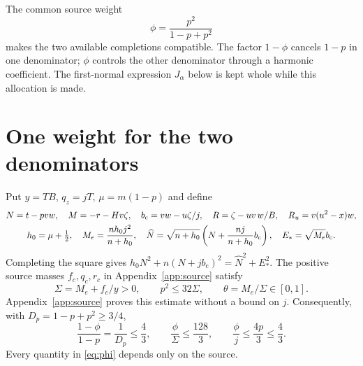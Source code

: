 \documentclass[10pt]{article}
\newcommand{\half}{\tfrac12}
\newcommand{\bc}{b_{\mathrm c}}
\begin{document}
The common source weight
\[
 \phi=\frac{p^2}{1-p+p^2}
\]
makes the two available completions compatible. The factor $1-\phi$ cancels
$1-p$ in one denominator; $\phi$ controls the other denominator through a
harmonic coefficient. The first-normal expression $J_\alpha$ below is kept
whole while this allocation is made.

\section{One weight for the two denominators}
Put $y=TB$, $q_z=jT$, $\mu=m(1-p)$ and define
\begin{gather}
 N=t-pvw,\quad M=-r-Hv\zeta,\quad
 \bc=vw-u\zeta/j,\quad R=\zeta-uv\,w/B,\quad R_u=v(u^2-x)w,\notag\\
 h_0=\mu+\half,\quad
 M_e=\frac{nh_0j^2}{n+h_0},\quad
 \widehat N=\sqrt{n+h_0}\left(N+\frac{nj}{n+h_0}\bc\right),\quad
 E_*=\sqrt{M_e}\bc .
 \label{eq:normal}
\end{gather}
Completing the square gives
$h_0N^2+n(N+j\bc)^2=\widehat N^2+E_*^2$.
The positive source masses $f_c,q_c,r_c$ in Appendix~\ref{app:source} satisfy
\begin{equation}
 \Sigma=M_e+f_c/y>0,\qquad p^2\leq32\Sigma,\qquad
 \theta=M_e/\Sigma\in[0,1].
 \label{eq:harmonic}
\end{equation}
Appendix~\ref{app:source} proves this estimate without a bound on $j$.
Consequently, with $D_p=1-p+p^2\geq3/4$,
\begin{equation}
 \frac{1-\phi}{1-p}=\frac1{D_p}\leq\frac43,\qquad
 \frac{\phi}{\Sigma}\leq\frac{128}{3},\qquad
 \frac{\phi}{j}\leq\frac{4p}{3}\leq\frac43 .
 \label{eq:phi}
\end{equation}
Every quantity in \eqref{eq:phi} depends only on the source.
\end{document}
